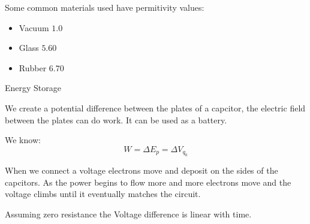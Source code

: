\documentclass{report}
\begin{document}
\begin{description}
\begin{mdframed}
            Some common materials used have permitivity values:
            \begin{itemize}
                \item Vacuum $1.0$ 
                \item Glass $5.60$
                \item Rubber $6.70$
            \end{itemize}
        \end{mdframed}
    \item {\large Energy Storage}
        \begin{mdframed}
            We create a potential difference between the plates
            of a capcitor, the electric field between the
            plates can do work. It can be used as a battery.

            We know:
            \begin{displaymath}
                W = \Delta E_p = \Delta V_{q_0}
            \end{displaymath}
            
            When we connect a voltage electrons move and
            deposit on the sides of the capcitors. As
            the power begins to flow more and more electrons
            move and the voltage climbs until it eventually matches
            the circuit.

            Assuming zero resistance the Voltage difference is
            linear with time.

            

        \end{mdframed}
\end{description}
\end{document}
